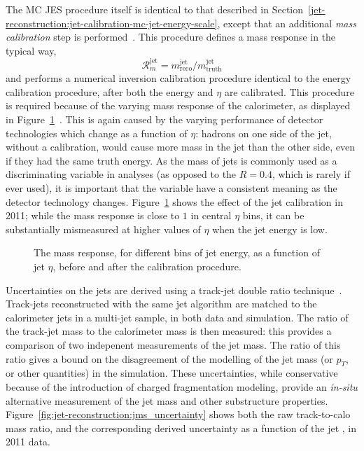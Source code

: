 The MC JES procedure itself is identical to that described in Section~\ref{jet-reconstruction:jet-calibration-mc-jet-energy-scale}, except that an additional \textit{mass calibration} step is performed~\cite{ATLAS-SS-2011}. This procedure defines a mass response in the typical way,
%
\begin{equation}
\mathcal{R}^{\mathrm{jet}}_m = m^{\mathrm{jet}}_{\mathrm{reco}} /  m^{\mathrm{jet}}_{\mathrm{truth}} 
\end{equation}
%
and performs a numerical inversion calibration procedure identical to the energy calibration procedure, after both the energy and $\eta$ are calibrated. This procedure is required because of the varying mass response of the calorimeter, as displayed in Figure~\ref{fig:jet-reconstruction:total_jms}~\cite{ATLAS-SS-2011}. This is again caused by the varying performance of detector technologies which change as a function of $\eta$: hadrons on one side of the jet, without a calibration, would cause more mass in the jet than the other side, even if they had the same truth energy. As the mass of \largeR jets is commonly used as a discriminating variable in analyses (as opposed to the $R=0.4$, which is rarely if ever used), it is important that the variable have a consistent meaning as the detector technology changes. Figure~\ref{fig:jet-reconstruction:total_jms} shows the effect of the jet calibration in 2011; while the mass response is close to $1$ in central $\eta$ bins, it can be substantially mismeasured at higher values of $\eta$ when the jet energy is low.

\begin{figure}
\centering
{}
\label{fig:jet-reconstruction:total_jms}
\caption{The mass response, for different bins of jet energy, as a function of jet $\eta$, before and after the calibration procedure.}
\end{figure}

Uncertainties on the \largeR jets are derived using a track-jet double ratio technique~\cite{ATLAS-SS-2011}. Track-jets reconstructed with the same jet algorithm are matched to the calorimeter jets in a multi-jet sample, in both data and simulation. The ratio of the track-jet mass to the calorimeter mass is then measured: this provides a comparison of two indepenent measurements of the jet mass. The ratio of this ratio gives a bound on the disagreement of the modelling of the jet mass (or $p_T$, or other quantities) in the simulation.  These uncertainties, while conservative because of the introduction of charged fragmentation modeling, provide an \textit{in-situ} alternative measurement of the jet mass and other substructure properties. Figure~\ref{fig:jet-reconstruction:jms_uncertainty} shows both the raw track-to-calo mass ratio, and the corresponding derived uncertainty as a function of the jet \pt, in 2011 data.

